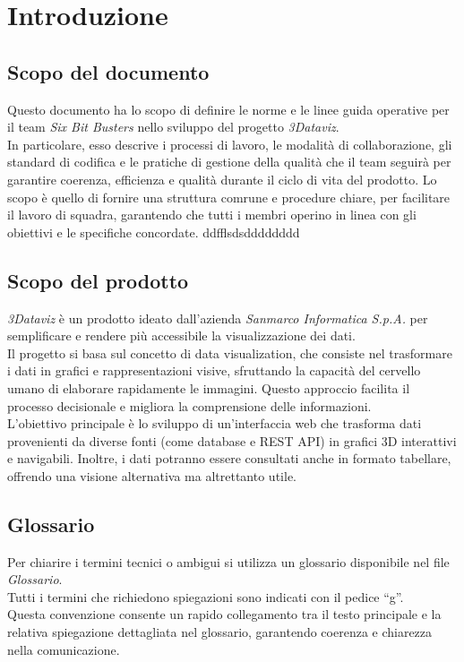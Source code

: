 \section{Introduzione}
    \subsection{Scopo del documento}
    Questo documento ha lo scopo di definire le norme e le linee guida operative per il team \textit{Six Bit Busters} nello sviluppo del progetto \textit{3Dataviz}.\\ 
    In particolare, esso descrive i processi di lavoro, le modalità di collaborazione, gli standard di codifica e le pratiche di gestione della qualità che il team seguirà per garantire coerenza, efficienza e qualità durante il ciclo di vita del prodotto. 
    Lo scopo è quello di fornire una struttura comrune e procedure chiare, per facilitare il lavoro di squadra, garantendo che tutti i membri operino in linea con gli obiettivi e le specifiche concordate.
ddfflsdsdddddddd
    \subsection{Scopo del prodotto}
    \textit{3Dataviz} è un prodotto ideato dall'azienda \textit{Sanmarco Informatica S.p.A.} per semplificare e rendere più accessibile la visualizzazione dei dati.\\
    Il progetto si basa sul concetto di data visualization, che consiste nel trasformare i dati in grafici e rappresentazioni visive, sfruttando la capacità del cervello umano di elaborare rapidamente le immagini. 
    Questo approccio facilita il processo decisionale e migliora la comprensione delle informazioni.\\
    L’obiettivo principale è lo sviluppo di un’interfaccia web che trasforma dati provenienti da diverse fonti (come database e REST API) in grafici 3D interattivi e navigabili. 
    Inoltre, i dati potranno essere consultati anche in formato tabellare, offrendo una visione alternativa ma altrettanto utile.  

    \subsection{Glossario}
    Per chiarire i termini tecnici o ambigui si utilizza un glossario disponibile nel file \textit{Glossario}.\\
    Tutti i termini che richiedono spiegazioni sono indicati con il pedice “g”. \\
    Questa convenzione consente un rapido collegamento tra il testo principale e la relativa spiegazione dettagliata nel glossario, garantendo coerenza e chiarezza nella comunicazione.

